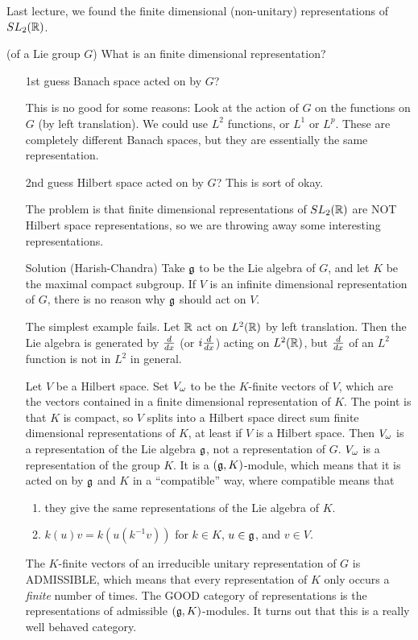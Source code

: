  \setcounter{lecture}{31}

 Last lecture, we found the finite dimensional (non-unitary) representations of
 $SL_2(\mathbb{R})$.

  (of a Lie group
 $G$) What is an finite dimensional representation?
 \begin{itemize}
   \item[1st guess] Banach space acted on by $G$?

   This is no good for some reasons: Look at the action of $G$ on the functions on $G$
   (by left translation). We could use $L^2$ functions, or $L^1$ or $L^p$. These are
   completely different Banach spaces, but they are essentially the same
   representation.

   \item[2nd guess] Hilbert space acted on by $G$? This is sort of okay.

   The problem is that finite dimensional representations of $SL_2(\mathbb{R})$ are NOT
   Hilbert space representations, so we are throwing away some interesting
   representations.

   \item[Solution] (Harish-Chandra) Take $\mathfrak{g}$ to be the Lie algebra of $G$, and let
   $K$ be the maximal compact subgroup. If $V$ is an infinite dimensional
   representation of $G$, there is no reason why $\mathfrak{g}$ should act on $V$.

   The simplest example fails. Let $\mathbb{R}$ act on $L^2(\mathbb{R})$ by left translation. Then
   the Lie algebra is generated by $\frac{d }{d x}$ (or $i\frac{d }{d x}$) acting on $L^2(\mathbb{R})$,
   but $\frac{d }{d x}$ of an $L^2$ function is not in $L^2$ in general.

   Let $V$ be a Hilbert space. Set $V_{\omega}$ to be the $K$-finite vectors of $V$, which are
   the vectors contained in a finite dimensional representation of $K$. The point is
   that $K$ is compact, so $V$ splits into a Hilbert space direct sum finite dimensional
   representations of $K$, at least if $V$ is a Hilbert space. Then $V_{\omega}$ is a
   representation of the Lie algebra $\mathfrak{g}$, not a representation of $G$. $V_{\omega}$ is a
   representation of the group $K$. It is a $(\mathfrak{g},K)$-module, which means that it is
   acted on by $\mathfrak{g}$ and $K$ in a ``compatible'' way, where compatible means that
   \begin{enumerate}
     \item they give the same representations of the Lie algebra of $K$.
     \item $k(u)v = k(u(k^{-1} v))$ for $k\in K$, $u\in \mathfrak{g}$, and $v\in V$.
   \end{enumerate}
   The $K$-finite vectors of an irreducible unitary representation of $G$ is
   ADMISSIBLE, which means that every representation of $K$ only occurs a
   \emph{finite} number of times. The GOOD category of representations is the
   representations of admissible $(\mathfrak{g},K)$-modules. It turns out that this is a really
   well behaved category.
 \end{itemize}

